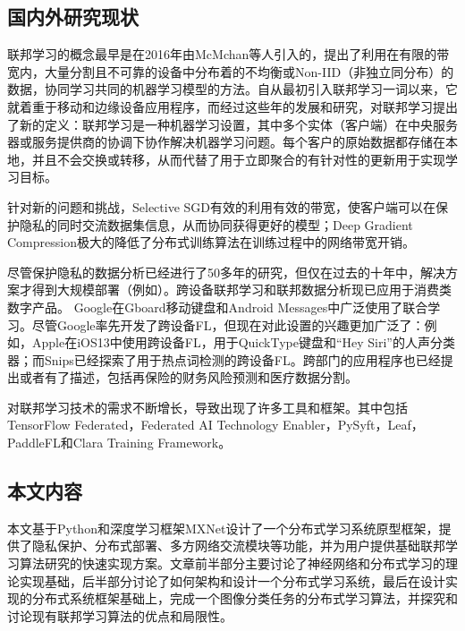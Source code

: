 \documentclass[zihao = -4,cn]{oucart}
\begin{document}
\subsection{国内外研究现状}
联邦学习的概念最早是在2016年由McMchan等人引入的\cite{mcmahan2016communication}，提出了利用在有限的带宽内，大量分割且不可靠的设备中分布着的不均衡或Non-IID（非独立同分布）的数据，协同学习共同的机器学习模型的方法。自从最初引入联邦学习一词以来，它就着重于移动和边缘设备应用程序\cite{mcmahan2016communication}\cite{googleaiblog}，而经过这些年的发展和研究，对联邦学习提出了新的定义：联邦学习是一种机器学习设置，其中多个实体（客户端）在中央服务器或服务提供商的协调下协作解决机器学习问题。每个客户的原始数据都存储在本地，并且不会交换或转移，从而代替了用于立即聚合的有针对性的更新用于实现学习目标。\par
针对新的问题和挑战，Selective SGD\cite{shokri2015privacy}有效的利用有效的带宽，使客户端可以在保护隐私的同时交流数据集信息，从而协同获得更好的模型；Deep Gradient Compression\cite{lin2017deep}极大的降低了分布式训练算法在训练过程中的网络带宽开销。\par
尽管保护隐私的数据分析已经进行了50多年的研究，但仅在过去的十年中，解决方案才得到大规模部署（例如\cite{erlingsson2014rappor}\cite{appleai}）。跨设备联邦学习和联邦数据分析现已应用于消费类数字产品。  Google在Gboard移动键盘\cite{chen2019federated}\cite{hard2018federated}\cite{ramaswamy2019federated}\cite{yang2018applied}和Android Messages中广泛使用了联合学习。尽管Google率先开发了跨设备FL，但现在对此设置的兴趣更加广泛了：例如，Apple在iOS13\cite{Apple}中使用跨设备FL，用于QuickType键盘和“Hey Siri”的人声分类器；而Snips已经探索了用于热点词检测的跨设备FL\cite{leroy2019federated}。跨部门的应用程序也已经提出或者有了描述，包括再保险的财务风险预测\cite{Webank}和医疗数据分割\cite{courtiol2019deep}。\par
对联邦学习技术的需求不断增长，导致出现了许多工具和框架。其中包括TensorFlow Federated，Federated AI Technology Enabler，PySyft，Leaf，PaddleFL和Clara Training Framework。\par

\subsection{本文内容}
本文基于Python和深度学习框架MXNet设计了一个分布式学习系统原型框架，提供了隐私保护、分布式部署、多方网络交流模块等功能，并为用户提供基础联邦学习算法研究的快速实现方案。文章前半部分主要讨论了神经网络和分布式学习的理论实现基础，后半部分讨论了如何架构和设计一个分布式学习系统，最后在设计实现的分布式系统框架基础上，完成一个图像分类任务的分布式学习算法，并探究和讨论现有联邦学习算法的优点和局限性。\par
\end{document}
